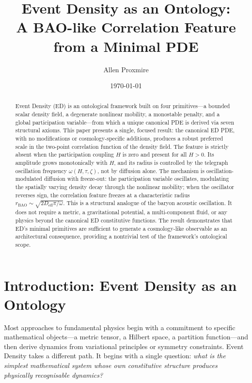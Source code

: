 \documentclass[11pt]{article}
\title{Event Density as an Ontology:\\A BAO-like Correlation Feature from a Minimal PDE}
\author{Allen Proxmire}
\date{\today}
\begin{document}
\maketitle
\tableofcontents
\newpage

\begin{abstract}
Event Density (ED) is an ontological framework built on four primitives---a bounded scalar density field, a degenerate nonlinear mobility, a monostable penalty, and a global participation variable---from which a unique canonical PDE is derived via seven structural axioms. This paper presents a single, focused result: the canonical ED PDE, with no modifications or cosmology-specific additions, produces a robust preferred scale in the two-point correlation function of the density field. The feature is strictly absent when the participation coupling \(H\) is zero and present for all \(H > 0\). Its amplitude grows monotonically with \(H\), and its radius is controlled by the telegraph oscillation frequency \(\omega(H, \tau, \zeta)\), not by diffusion alone. The mechanism is oscillation-modulated diffusion with freeze-out: the participation variable oscillates, modulating the spatially varying density decay through the nonlinear mobility; when the oscillator reverses sign, the correlation feature freezes at a characteristic radius \(r_{\mathrm{BAO}} \sim \sqrt{2 D_{\mathrm{eff}} \pi / \omega}\). This is a structural analogue of the baryon acoustic oscillation. It does not require a metric, a gravitational potential, a multi-component fluid, or any physics beyond the canonical ED constitutive functions. The result demonstrates that ED's minimal primitives are sufficient to generate a cosmology-like observable as an architectural consequence, providing a nontrivial test of the framework's ontological scope.
\end{abstract}

\section{Introduction: Event Density as an Ontology}

Most approaches to fundamental physics begin with a commitment to specific mathematical objects---a metric tensor, a Hilbert space, a partition function---and then derive dynamics from variational principles or symmetry constraints. Event Density takes a different path. It begins with a single question: \emph{what is the simplest mathematical system whose own constitutive structure produces physically recognisable dynamics?}
\end{document}
